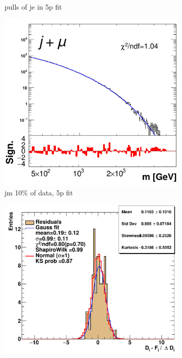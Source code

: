 \begin{figure}[H]
\begin{subfigure}[h]{0.4\linewidth}
    \caption{pulls of je in 5p fit}
    \end{subfigure}
    \hfill
    \begin{subfigure}[h]{0.38\linewidth}
    \includegraphics[scale=0.3]{figs/app/10data/pub_mass_10per_extrapolate_jm.pdf}%
     \caption{jm 10\% of data, 5p fit}
     \end{subfigure}
     \hfill
    \begin{subfigure}[h]{0.4\linewidth}
    \includegraphics[scale=0.32]{figs/app/10data/pub_mass_10per_extrapolate_residuals_jm.pdf}%

\end{subfigure}
\end{figure}
